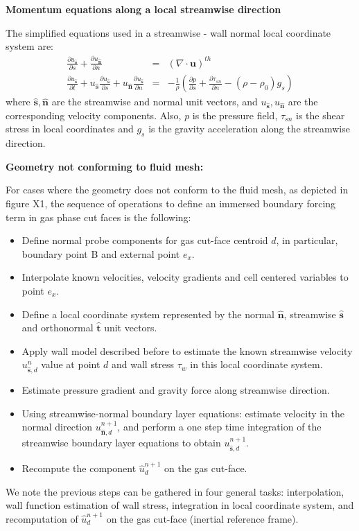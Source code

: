 \documentclass[12pt]{article}
\begin{document}



\bigskip
\noindent 
\textbf{Momentum equations along a local streamwise direction}
\bigskip

The simplified equations used in a streamwise - wall normal local coordinate system are:
%
\begin{eqnarray}
   \frac{\partial u_{\hat{\mathbf{s}}}}{\partial s} +  \frac{\partial u_{\hat{\mathbf{n}}}}{\partial n} &=& \left( \nabla \cdot \mathbf{u} \right)^{th}  \label{eq:blcont} \\
    \frac{\partial u_{\hat{\mathbf{s}}}}{\partial t} + u_{\hat{\mathbf{s}}} \frac{\partial u_{\hat{\mathbf{s}}}}{\partial s} +
    u_{\hat{\mathbf{n}}} \frac{\partial u_{\hat{\mathbf{s}}}}{\partial n} &=& - \frac{1}{\rho} \left( \frac{\partial p}{\partial s} +
    \frac{\partial \tau_{sn}}{\partial n} - (\rho -\rho_0) g_s \right) \label{eq:blmom}
\end{eqnarray}
%
where $\hat{\mathbf{s}},\hat{\mathbf{n}}$ are the streamwise and normal unit vectors, and $u_{\hat{\mathbf{s}}},u_{\hat{\mathbf{n}}}$ are the corresponding velocity components. Also, $p$ is the pressure field, $\tau_{sn}$ is the shear stress in local coordinates and $g_s$ is the gravity acceleration along the streamwise direction.

\bigskip
\noindent 
\textbf{Geometry not conforming to fluid mesh:}
\bigskip

For cases where the geometry does not conform to the fluid mesh, as depicted in figure X1, the sequence of operations to define an immersed boundary forcing term in gas phase cut faces is the following:
%
\begin{itemize}
   \item Define normal probe components for gas cut-face centroid $d$, in particular, boundary point B and external point $e_x$.
   \item Interpolate known velocities, velocity gradients and cell centered variables to point $e_x$.
   \item Define a local coordinate system represented by the normal $\hat{\mathbf{n}}$, streamwise $\hat{\mathbf{s}}$ and orthonormal $\hat{\mathbf{t}}$ unit vectors.
   \item Apply wall model described before to estimate the known streamwise velocity $u_{\hat{\mathbf{s}},d}^n$ value at point $d$ and wall stress $\tau_w$ in this local coordinate system.
   \item Estimate pressure gradient and gravity force along streamwise direction.
   \item Using streamwise-normal boundary layer equations: estimate velocity in the normal direction $u_{\hat{\mathbf{n}},d}^{n+1}$, and perform a one step time integration of the streamwise boundary layer equations to obtain $u_{\hat{\mathbf{s}},d}^{n+1}$.
   \item Recompute the component $\hat{u}_d^{n+1}$ on the gas cut-face.
\end{itemize}
%
We note the previous steps can be gathered in four general tasks: interpolation, wall function estimation of wall stress, integration in local coordinate system, and recomputation of $\hat{u}_d^{n+1}$ on the gas cut-face (inertial reference frame).
\end{document}
